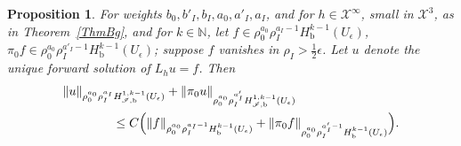 \documentclass[reqno,11pt,letterpaper]{amsart}
\numberwithin{equation}{section}
\numberwithin{figure}{section}
\newtheorem{prop}[thm]{Proposition}
\theoremstyle{definition}
\theoremstyle{remark}
\newcommand{\mc}{\mathcal}
\newcommand{\cX}{\mc X}
\newcommand{\ms}{\mathscr}
\newcommand{\scri}{\ms I}
\newcommand{\N}{\mathbb{N}}
\newcommand{\eps}{\epsilon}
\newcommand{\bop}{{\mathrm{b}}}
\newcommand{\half}{\tfrac{1}{2}}
\newcommand{\Hb}{H_{\bop}}
\newcommand{\Hscrib}{H_{\scri,\bop}}
\newcommand{\usref}[1]{{\upshape\ref{#1}}}
\begin{document}
\begin{prop}
\label{PropBgscri}
 For weights $b_0,b'_I,b_I,a_0,a'_I,a_I$, and for $h\in\cX^\infty$, small in $\cX^3$, as in Theorem~\usref{ThmBg}, and for $k\in\N$, let $f\in\rho_0^{a_0}\rho_I^{a_I-1}\Hb^{k-1}(U_\eps)$, $\pi_0 f\in\rho_0^{a_0}\rho_I^{a'_I-1}\Hb^{k-1}(U_\eps)$; suppose $f$ vanishes in $\rho_I>\half\eps$. Let $u$ denote the unique forward solution of $L_h u=f$. Then
  \begin{equation}
  \label{EqBgscri}
  \begin{split}
    &\|u\|_{\rho_0^{a_0}\rho_I^{a_I}\Hscrib^{1,k-1}(U_\eps)} + \|\pi_0 u\|_{\rho_0^{a_0}\rho_I^{a'_I}\Hscrib^{1,k-1}(U_\eps)} \\
    &\qquad\qquad \leq C\Bigl(\|f\|_{\rho_0^{a_0}\rho_I^{a_I-1}\Hb^{k-1}(U_\eps)} + \|\pi_0 f\|_{\rho_0^{a_0}\rho_I^{a'_I-1}\Hb^{k-1}(U_\eps)}\Bigr).
  \end{split}
  \end{equation}
\end{prop}
\end{document}
